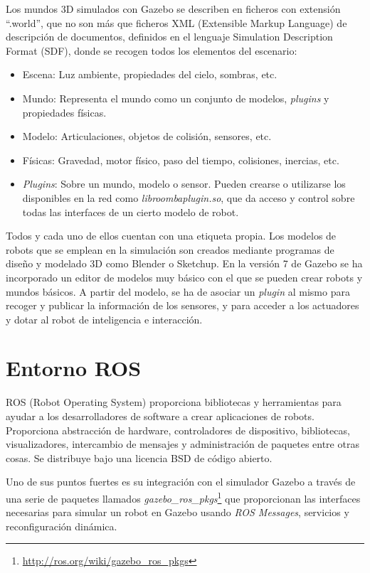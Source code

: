 Los mundos 3D simulados con Gazebo se describen en ficheros con extensión “.world”, que no son más que ficheros XML (Extensible Markup Language) de descripción de documentos, definidos en el lenguaje Simulation Description Format (SDF), donde se recogen todos los elementos del escenario:

\begin{itemize}
	\item Escena: Luz ambiente, propiedades del cielo, sombras, etc.
	\item Mundo: Representa el mundo como un conjunto de modelos, \textit{plugins} y propiedades físicas.
	\item Modelo: Articulaciones, objetos de colisión, sensores, etc.
	\item Físicas: Gravedad, motor físico, paso del tiempo, colisiones, inercias, etc.
	\item \textit{Plugins}: Sobre un mundo, modelo o sensor. Pueden crearse o utilizarse los disponibles en la red como \textit{libroombaplugin.so}, que da acceso y control sobre todas las interfaces de un cierto modelo de robot.
\end{itemize}

Todos y cada uno de ellos cuentan con una etiqueta propia. Los modelos de robots que se emplean en la simulación son creados mediante programas de diseño y modelado 3D como Blender o Sketchup. En la versión 7 de Gazebo se ha incorporado un editor de modelos muy básico con el que se pueden crear robots y mundos básicos. A partir del modelo, se ha de asociar un \textit{plugin} al mismo para recoger y publicar la información de los sensores, y para acceder a los actuadores y dotar al robot de inteligencia e interacción.

\section{Entorno ROS}
ROS (Robot Operating System) proporciona bibliotecas y herramientas para ayudar a los desarrolladores de software a crear aplicaciones de robots. Proporciona abstracción de hardware, controladores de dispositivo, bibliotecas, visualizadores, intercambio de mensajes y administración de paquetes entre otras cosas. Se distribuye bajo una licencia BSD de código abierto.

Uno de sus puntos fuertes es su integración con el simulador Gazebo a través de una serie de paquetes llamados \textit{gazebo\_ros\_pkgs}\footnote{\url{http://ros.org/wiki/gazebo\_ros\_pkgs}} que proporcionan las interfaces necesarias para simular un robot en Gazebo usando \textit{ROS Messages}, servicios y reconfiguración dinámica.

